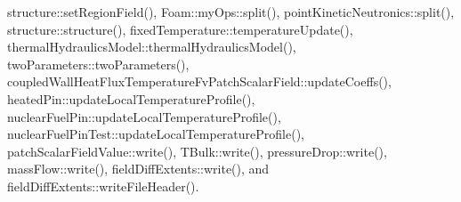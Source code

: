 structure\+::set\+Region\+Field(), Foam\+::my\+Ops\+::split(), point\+Kinetic\+Neutronics\+::split(), structure\+::structure(), fixed\+Temperature\+::temperature\+Update(), thermal\+Hydraulics\+Model\+::thermal\+Hydraulics\+Model(), two\+Parameters\+::two\+Parameters(), coupled\+Wall\+Heat\+Flux\+Temperature\+Fv\+Patch\+Scalar\+Field\+::update\+Coeffs(), heated\+Pin\+::update\+Local\+Temperature\+Profile(), nuclear\+Fuel\+Pin\+::update\+Local\+Temperature\+Profile(), nuclear\+Fuel\+Pin\+Test\+::update\+Local\+Temperature\+Profile(), patch\+Scalar\+Field\+Value\+::write(), T\+Bulk\+::write(), pressure\+Drop\+::write(), mass\+Flow\+::write(), field\+Diff\+Extents\+::write(), and field\+Diff\+Extents\+::write\+File\+Header().

